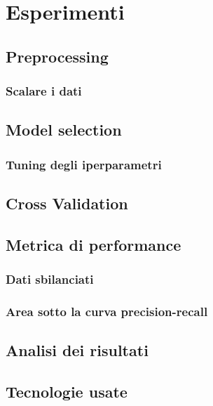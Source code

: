 \documentclass[12pt,italian]{report}
\begin{document}
	\chapter{Esperimenti}
	\section{Preprocessing}
	\subsection{Scalare i dati}
	
	\section{Model selection}
	\subsection{Tuning degli iperparametri}

	\section{Cross Validation}
	
	\section{Metrica di performance}
	\subsection{Dati sbilanciati}
	\subsection{Area sotto la curva precision-recall}
	
	\section{Analisi dei risultati}
	
	\section{Tecnologie usate}
	
	
	
	
	
	
\end{document}
